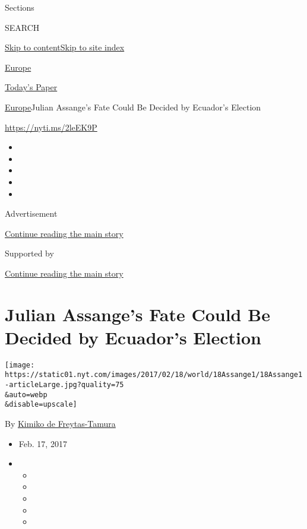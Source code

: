 Sections

SEARCH

\protect\hyperlink{site-content}{Skip to
content}\protect\hyperlink{site-index}{Skip to site index}

\href{https://www.nytimes.com/section/world/europe}{Europe}

\href{https://myaccount.nytimes.com/auth/login?response_type=cookie\&client_id=vi}{}

\href{https://www.nytimes.com/section/todayspaper}{Today's Paper}

\href{/section/world/europe}{Europe}\textbar{}Julian Assange's Fate
Could Be Decided by Ecuador's Election

\url{https://nyti.ms/2leEK9P}

\begin{itemize}
\item
\item
\item
\item
\item
\end{itemize}

Advertisement

\protect\hyperlink{after-top}{Continue reading the main story}

Supported by

\protect\hyperlink{after-sponsor}{Continue reading the main story}

\hypertarget{julian-assanges-fate-could-be-decided-by-ecuadors-election}{%
\section{Julian Assange's Fate Could Be Decided by Ecuador's
Election}\label{julian-assanges-fate-could-be-decided-by-ecuadors-election}}

\texttt{[image: https://static01.nyt.com/images/2017/02/18/world/18Assange1/18Assange1-articleLarge.jpg?quality=75\\\&auto=webp\\\&disable=upscale]}

By \href{https://www.nytimes.com/by/kimiko-de-freytas-tamura}{Kimiko de
Freytas-Tamura}

\begin{itemize}
\item
  Feb. 17, 2017
\item
  \begin{itemize}
  \item
  \item
  \item
  \item
  \item
  \end{itemize}
\end{itemize}


